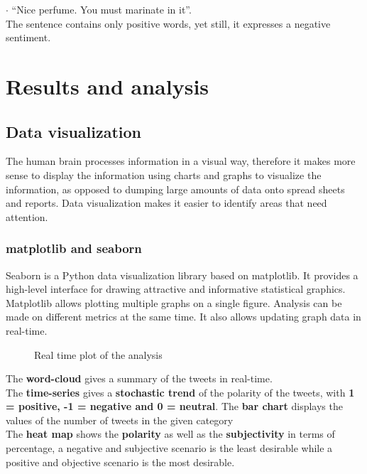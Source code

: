 $\cdot$ “Nice perfume. You must marinate in it”.\\
The sentence contains only positive words, yet still, it expresses a negative sentiment.






\chapter{Results and analysis}\label{ch:Results}
\section{Data visualization}
The human brain processes information in a visual way, therefore it makes more sense to display the information using charts and graphs to visualize the information, as opposed to dumping large amounts of data onto spread sheets and reports. Data visualization makes it easier to identify areas that need attention.

\subsection{matplotlib and seaborn}
Seaborn is a Python data visualization library based on matplotlib. It provides a high-level interface for drawing attractive and informative statistical graphics.
Matplotlib allows plotting multiple graphs on a single figure. Analysis can be made on different metrics at the same time. It also allows updating graph data in real-time.
\clearpage
\begin{figure}[h]
  \centering
  \caption[Real time plot of the analysis]
  {Real time plot of the analysis}
  \label{fig:ALAP:sm1}
\end{figure}


The \textbf{word-cloud} gives a summary of the tweets in real-time.\\
The \textbf{time-series} gives a \textbf{stochastic trend} of the polarity of the tweets, with \textbf{1 = positive, -1 = negative and 0 = neutral}.
The \textbf{bar chart} displays the values of the number of tweets in the given category\\
The \textbf{heat map} shows the \textbf{polarity} as well as the \textbf{subjectivity} in terms of percentage,
a negative and subjective scenario is the least desirable while a positive and objective scenario is the most desirable.\\

